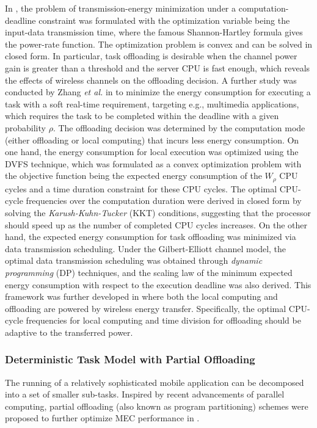 \documentclass[journal]{IEEEtran}
\begin{document}
In \cite{BarbarossaMSP1411}, the problem of transmission-energy minimization  under a computation-deadline  constraint was formulated with the optimization variable being  the input-data  transmission time, where the famous Shannon-Hartley formula gives the power-rate function. The optimization problem is convex  and can be solved in closed form. In particular, task offloading is desirable when the channel power gain is greater than a threshold and the server CPU is fast enough, which reveals the effects  of wireless channels on the offloading decision. A further study was conducted by Zhang \emph{et al.} in \cite{WZhangTWC1312} to minimize the energy consumption for executing a task with a soft real-time requirement, targeting e.g., multimedia applications, which requires the task to be completed within the deadline with a given  probability $\rho$. The offloading decision was determined by the computation mode (either offloading or local computing) that incurs less energy consumption. On one hand, the energy consumption for local execution was optimized using the DVFS technique, which was formulated as a convex optimization problem with the objective function being the expected energy consumption of the $W_{\rho}$ CPU cycles and a time duration constraint for these CPU cycles. The optimal CPU-cycle frequencies over the computation duration were derived in closed form by solving the \emph{Karush-Kuhn-Tucker} (KKT) conditions, suggesting that the processor should speed up as the number of completed CPU cycles increases. On the other hand, the expected energy consumption for task offloading was minimized via data transmission scheduling. Under the Gilbert-Elliott channel model, the optimal data transmission scheduling was obtained through \emph{dynamic programming} (DP) techniques, and the scaling law of the minimum expected energy consumption with respect to the execution deadline was also derived. This framework was further developed in \cite{you2016energyJSAC} where both the local computing and offloading are powered by wireless energy transfer. Specifically, the optimal CPU-cycle frequencies for local computing and time division for offloading should be adaptive to the transferred power.

\subsubsection{\textbf{Deterministic Task Model with Partial Offloading}}  The running of a relatively sophisticated mobile  application can be decomposed into a set of smaller sub-tasks. Inspired by recent advancements of parallel computing, partial offloading (also known  as program partitioning) schemes were proposed to further optimize MEC performance in \cite{YWangTCOM16,MJiaINFOCOMWS1404,MahmoodiTCC16,KaoINFOCOM1504,WZhangTWC1501,Khalili1508,PLorenzo1603,MahmoodiICC1506}.
\end{document}
